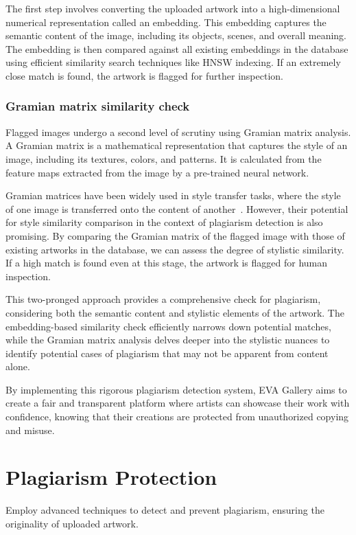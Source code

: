 The first step involves converting the uploaded artwork into a high-dimensional numerical representation called an embedding. This embedding captures the semantic content of the image, including its objects, scenes, and overall meaning. The embedding is then compared against all existing embeddings in the database using efficient similarity search techniques like HNSW indexing. If an extremely close match is found, the artwork is flagged for further inspection.

\subsubsection{Gramian matrix similarity check}

Flagged images undergo a second level of scrutiny using Gramian matrix analysis. A Gramian matrix is a mathematical representation that captures the style of an image, including its textures, colors, and patterns. It is calculated from the feature maps extracted from the image by a pre-trained neural network.

Gramian matrices have been widely used in style transfer tasks, where the style of one image is transferred onto the content of another~\cite{nicolas2019improving}. However, their potential for style similarity comparison in the context of plagiarism detection is also promising. By comparing the Gramian matrix of the flagged image with those of existing artworks in the database, we can assess the degree of stylistic similarity. If a high match is found even at this stage, the artwork is flagged for human inspection.

This two-pronged approach provides a comprehensive check for plagiarism, considering both the semantic content and stylistic elements of the artwork. The embedding-based similarity check efficiently narrows down potential matches, while the Gramian matrix analysis delves deeper into the stylistic nuances to identify potential cases of plagiarism that may not be apparent from content alone.

By implementing this rigorous plagiarism detection system, EVA Gallery aims to create a fair and transparent platform where artists can showcase their work with confidence, knowing that their creations are protected from unauthorized copying and misuse.

\section{Plagiarism Protection}
Employ advanced techniques to detect and prevent plagiarism, ensuring the originality of uploaded artwork.

